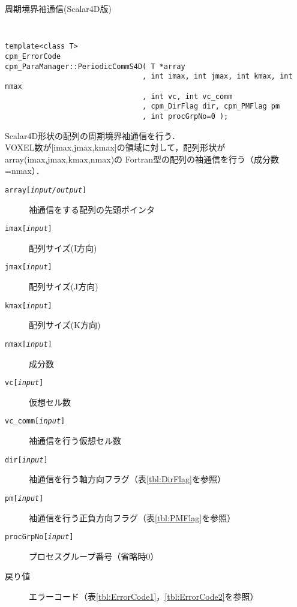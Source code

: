 \begin{spacing}{0.8}
\begin{itembox}[l]{周期境界袖通信(Scalar4D版)}
{\tt
\begin{verbatim}
template<class T>
cpm_ErrorCode
cpm_ParaManager::PeriodicCommS4D( T *array
                                , int imax, int jmax, int kmax, int nmax
                                , int vc, int vc_comm
                                , cpm_DirFlag dir, cpm_PMFlag pm
                                , int procGrpNo=0 );
\end{verbatim}
}
Scalar4D形状の配列の周期境界袖通信を行う．\\
VOXEL数が[imax,jmax,kmax]の領域に対して，配列形状がarray(imax,jmax,kmax,nmax)の
Fortran型の配列の袖通信を行う（成分数=nmax）．
\begin{description}
\item[{\tt array[{\it input/output}]}] 袖通信をする配列の先頭ポインタ
\item[{\tt imax[{\it input}]}] 配列サイズ(I方向)
\item[{\tt jmax[{\it input}]}] 配列サイズ(J方向)
\item[{\tt kmax[{\it input}]}] 配列サイズ(K方向)
\item[{\tt nmax[{\it input}]}] 成分数
\item[{\tt vc[{\it input}]}] 仮想セル数
\item[{\tt vc\_comm[{\it input}]}] 袖通信を行う仮想セル数
\item[{\tt dir[{\it input}]}] 袖通信を行う軸方向フラグ（表\ref{tbl:DirFlag}を参照）
\item[{\tt pm[{\it input}]}] 袖通信を行う正負方向フラグ（表\ref{tbl:PMFlag}を参照）
\item[{\tt procGrpNo[{\it input}]}] プロセスグループ番号（省略時0）
\\
\item[戻り値] エラーコード（表\ref{tbl:ErrorCode1}，\ref{tbl:ErrorCode2}を参照）
\end{description}
\end{itembox}\\
\end{spacing}

